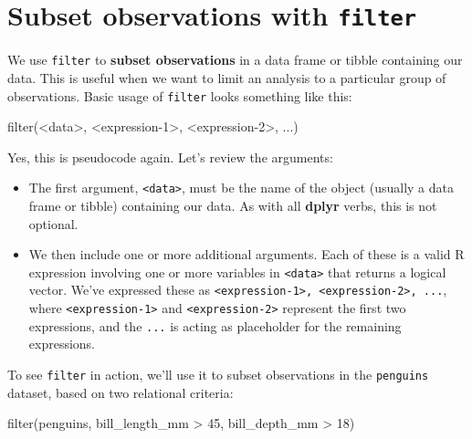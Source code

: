 \documentclass[
]{book}
\newenvironment{Shaded}{\begin{snugshade}}{\end{snugshade}}
\newcommand{\DecValTok}[1]{\textcolor[rgb]{0.00,0.00,0.81}{#1}}
\newcommand{\FunctionTok}[1]{\textcolor[rgb]{0.00,0.00,0.00}{#1}}
\newcommand{\NormalTok}[1]{#1}
\newcommand{\SpecialCharTok}[1]{\textcolor[rgb]{0.00,0.00,0.00}{#1}}
\providecommand{\tightlist}{%
  \setlength{\itemsep}{0pt}\setlength{\parskip}{0pt}}
\begin{document}
\hypertarget{subset-observations-with-filter}{%
\section{\texorpdfstring{Subset observations with \texttt{filter}}{Subset observations with filter}}\label{subset-observations-with-filter}}

We use \texttt{filter} to \textbf{subset observations} in a data frame or tibble containing our data. This is useful when we want to limit an analysis to a particular group of observations. Basic usage of \texttt{filter} looks something like this:

\begin{Shaded}
\begin{Highlighting}[]
\FunctionTok{filter}\NormalTok{(}\SpecialCharTok{\textless{}}\NormalTok{data}\SpecialCharTok{\textgreater{}}\NormalTok{, }\SpecialCharTok{\textless{}}\NormalTok{expression}\DecValTok{{-}1}\SpecialCharTok{\textgreater{}}\NormalTok{, }\SpecialCharTok{\textless{}}\NormalTok{expression}\DecValTok{{-}2}\SpecialCharTok{\textgreater{}}\NormalTok{, ...)}
\end{Highlighting}
\end{Shaded}

Yes, this is pseudocode again. Let's review the arguments:

\begin{itemize}
\tightlist
\item
  The first argument, \texttt{\textless{}data\textgreater{}}, must be the name of the object (usually a data frame or tibble) containing our data. As with all \textbf{dplyr} verbs, this is not optional.
\item
  We then include one or more additional arguments. Each of these is a valid R expression involving one or more variables in \texttt{\textless{}data\textgreater{}} that returns a logical vector. We've expressed these as \texttt{\textless{}expression-1\textgreater{},\ \textless{}expression-2\textgreater{},\ ...}, where \texttt{\textless{}expression-1\textgreater{}} and \texttt{\textless{}expression-2\textgreater{}} represent the first two expressions, and the \texttt{...} is acting as placeholder for the remaining expressions.
\end{itemize}

To see \texttt{filter} in action, we'll use it to subset observations in the \texttt{penguins} dataset, based on two relational criteria:

\begin{Shaded}
\begin{Highlighting}[]
\FunctionTok{filter}\NormalTok{(penguins, bill\_length\_mm }\SpecialCharTok{\textgreater{}} \DecValTok{45}\NormalTok{, bill\_depth\_mm }\SpecialCharTok{\textgreater{}} \DecValTok{18}\NormalTok{)}
\end{Highlighting}
\end{Shaded}
\end{document}
